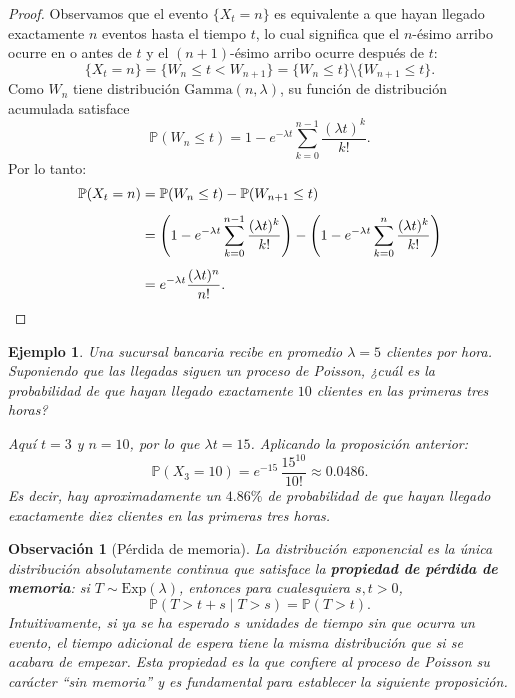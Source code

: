 \documentclass[12pt]{book}
\newtheorem{example}{Ejemplo}[chapter]
\newtheorem{remark}{Observación}[chapter]
\begin{document}
\begin{proof}
Observamos que el evento $\{X_t = n\}$ es equivalente a que hayan llegado exactamente $n$ eventos hasta el tiempo $t$, lo cual significa que el $n$-ésimo arribo ocurre en o antes de $t$ y el $(n+1)$-ésimo arribo ocurre después de $t$:
\[
    \{X_t = n\} = \{W_n \le t < W_{n+1}\} = \{W_n \le t\} \setminus \{W_{n+1} \le t\}.
\]
Como $W_n$ tiene distribución $\mathrm{Gamma}(n,\lambda)$, su función de distribución acumulada satisface
\[
    \mathbb{P}(W_n \le t) = 1 - e^{-\lambda t}\sum_{k=0}^{n-1}\frac{(\lambda t)^k}{k!}.
\]
Por lo tanto:
\begin{align*}
    \mathbb{P}(X_t = n)
    &= \mathbb{P}(W_n \le t) - \mathbb{P}(W_{n+1} \le t) \\[4pt]
    &= \left(1 - e^{-\lambda t}\sum_{k=0}^{n-1}\frac{(\lambda t)^k}{k!}\right)
       - \left(1 - e^{-\lambda t}\sum_{k=0}^{n}\frac{(\lambda t)^k}{k!}\right) \\[4pt]
    &= e^{-\lambda t}\frac{(\lambda t)^n}{n!}.\qedhere
\end{align*}
\end{proof}

\begin{example}
Una sucursal bancaria recibe en promedio $\lambda = 5$ clientes por hora. Suponiendo que las llegadas siguen un proceso de Poisson, ¿cuál es la probabilidad de que hayan llegado exactamente $10$ clientes en las primeras tres horas?

Aquí $t = 3$ y $n = 10$, por lo que $\lambda t = 15$. Aplicando la proposición anterior:
\[
    \mathbb{P}(X_3 = 10) = e^{-15}\,\frac{15^{10}}{10!} \approx 0.0486.
\]
Es decir, hay aproximadamente un $4.86\%$ de probabilidad de que hayan llegado exactamente diez clientes en las primeras tres horas.
\end{example}

\begin{remark}[Pérdida de memoria]
La distribución exponencial es la única distribución absolutamente continua que satisface la \textbf{propiedad de pérdida de memoria}: si $T \sim \mathrm{Exp}(\lambda)$, entonces para cualesquiera $s, t > 0$,
\[
    \mathbb{P}(T > t + s \mid T > s) = \mathbb{P}(T > t).
\]
Intuitivamente, si ya se ha esperado $s$ unidades de tiempo sin que ocurra un evento, el tiempo adicional de espera tiene la misma distribución que si se acabara de empezar. Esta propiedad es la que confiere al proceso de Poisson su carácter ``sin memoria'' y es fundamental para establecer la siguiente proposición.
\end{remark}
\end{document}
